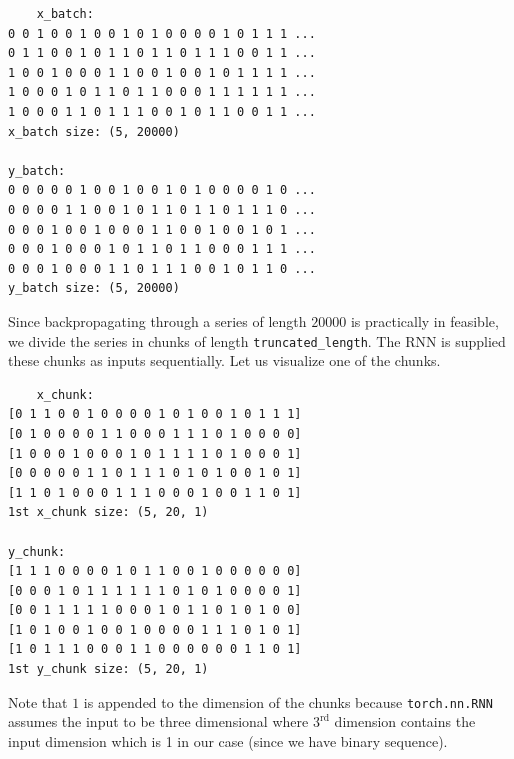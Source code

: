 \begin{verbatim}
    x_batch:
0 0 1 0 0 1 0 0 1 0 1 0 0 0 0 1 0 1 1 1 ...
0 1 1 0 0 1 0 1 1 0 1 1 0 1 1 1 0 0 1 1 ...
1 0 0 1 0 0 0 1 1 0 0 1 0 0 1 0 1 1 1 1 ...
1 0 0 0 1 0 1 1 0 1 1 0 0 0 1 1 1 1 1 1 ...
1 0 0 0 1 1 0 1 1 1 0 0 1 0 1 1 0 0 1 1 ...
x_batch size: (5, 20000)

y_batch:
0 0 0 0 0 1 0 0 1 0 0 1 0 1 0 0 0 0 1 0 ...
0 0 0 0 1 1 0 0 1 0 1 1 0 1 1 0 1 1 1 0 ...
0 0 0 1 0 0 1 0 0 0 1 1 0 0 1 0 0 1 0 1 ...
0 0 0 1 0 0 0 1 0 1 1 0 1 1 0 0 0 1 1 1 ...
0 0 0 1 0 0 0 1 1 0 1 1 1 0 0 1 0 1 1 0 ...
y_batch size: (5, 20000)
\end{verbatim}
Since backpropagating through a series of length $20000$ is practically in feasible, we divide the series in chunks of length \texttt{truncated\_length}. 
The RNN is supplied these chunks as inputs sequentially.
Let us visualize one of the chunks.

\begin{verbatim}
    x_chunk:
[0 1 1 0 0 1 0 0 0 0 1 0 1 0 0 1 0 1 1 1]
[0 1 0 0 0 0 1 1 0 0 0 1 1 1 0 1 0 0 0 0]
[1 0 0 0 1 0 0 0 1 0 1 1 1 1 0 1 0 0 0 1]
[0 0 0 0 0 1 1 0 1 1 1 0 1 0 1 0 0 1 0 1]
[1 1 0 1 0 0 0 1 1 1 0 0 0 1 0 0 1 1 0 1]
1st x_chunk size: (5, 20, 1)

y_chunk:
[1 1 1 0 0 0 0 1 0 1 1 0 0 1 0 0 0 0 0 0]
[0 0 0 1 0 1 1 1 1 1 1 0 1 0 1 0 0 0 0 1]
[0 0 1 1 1 1 1 0 0 0 1 0 1 1 0 1 0 1 0 0]
[1 0 1 0 0 1 0 0 1 0 0 0 0 1 1 1 0 1 0 1]
[1 0 1 1 1 0 0 0 1 1 0 0 0 0 0 0 1 1 0 1]
1st y_chunk size: (5, 20, 1)
\end{verbatim}
Note that $1$ is appended to the dimension of the chunks because \texttt{torch.nn.RNN} assumes the input to be three dimensional where $3^{\text{rd}}$ dimension contains the input dimension which is 1 in our case (since we have binary sequence).

